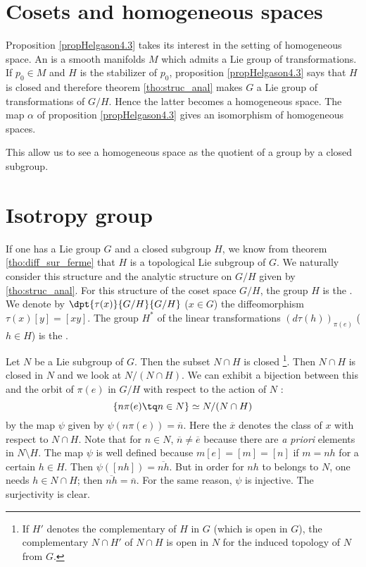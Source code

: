 \section{Cosets and homogeneous spaces}

Proposition \ref{propHelgason4.3} takes its interest in the setting of homogeneous space. An  is a smooth manifolds $M$ which admits a Lie group of transformations. If $p_{0}\in M$ and $H$ is the stabilizer of $p_{0}$, proposition \ref{propHelgason4.3} says that $H$ is closed and therefore theorem \ref{tho:struc_anal} makes $G$ a Lie group of transformations of $G/H$. Hence the latter becomes a homogeneous space. The map $\alpha$ of proposition \ref{propHelgason4.3} gives an isomorphism of homogeneous spaces. 

This allow us to see a homogeneous space as the quotient of a group by a closed subgroup.

\section{Isotropy group}

If one has a Lie group $G$ and a closed subgroup $H$, we know from theorem \ref{tho:diff_sur_ferme} that $H$ is a topological Lie subgroup of $G$. We naturally consider this structure and the analytic structure on $G/H$ given by \ref{tho:struc_anal}. For this structure of the coset space $G/H$, the group $H$ is the . We denote by $\dpt{\tau(x)}{G/H}{G/H}$ ($x\in G$) the diffeomorphism $\tau(x)[y]=[xy]$. The group $H^*$ of the linear transformations $(d\tau(h))_{\pi(e)}$ ($h\in H$) is the .


Let $N$ be a Lie subgroup of $G$. Then the subset $N\cap H$ is closed
\footnote{If $H'$ denotes the complementary of $H$ in $G$ (which is open in $G$), the complementary $N\cap H'$ of $N\cap H$ is open in $N$ for the induced topology of $N$ from $G$.}. Then $N\cap H$ is closed in $N$ and we look at $N/(N\cap H)$. We can exhibit a bijection between this and the orbit of $\pi(e)$ in $G/H$ with respect to the action of $N$ :
\begin{equation}
  \{ n\pi(e)\tq n\in N \}\simeq N/(N\cap H)
\end{equation}
by the map $\psi$ given by $\psi(n\pi(e))=\overline{n}$. Here the $\overline{ x }$ denotes the class of $x$ with respect to $N\cap H$. Note that for $n\in N$, $\overline{n}\neq\overline{e}$ because there are \emph{a priori} elements in $N\setminus H$. The map $\psi$ is well defined because $m[e]=[m]=[n]$ if $m=nh$ for a certain $h\in H$. Then $\psi([nh])=\overline{nh}$. But in order for $nh$ to belongs to $N$, one needs $h\in N\cap H$; then $\overline{nh}=\overline{n}$. For the same reason, $\psi$ is injective. The surjectivity is clear.

